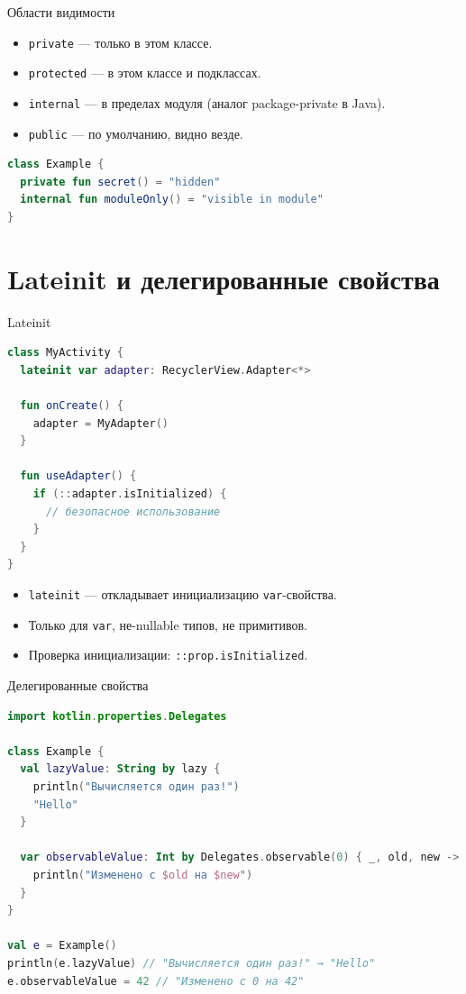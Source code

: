 \documentclass[aspectratio=169]{beamer}
\begin{document}
\begin{frame}[fragile]{Области видимости}
  \begin{itemize}
    \item \texttt{private} — только в этом классе.
    \item \texttt{protected} — в этом классе и подклассах.
    \item \texttt{internal} — в пределах модуля (аналог package-private в Java).
    \item \texttt{public} — по умолчанию, видно везде.
  \end{itemize}
  \begin{lstlisting}[language=Kotlin]
class Example {
  private fun secret() = "hidden"
  internal fun moduleOnly() = "visible in module"
}
  \end{lstlisting}
\end{frame}

\section{Lateinit и делегированные свойства}

\begin{frame}[fragile]{Lateinit}
  \begin{lstlisting}[language=Kotlin]
class MyActivity {
  lateinit var adapter: RecyclerView.Adapter<*>

  fun onCreate() {
    adapter = MyAdapter()
  }

  fun useAdapter() {
    if (::adapter.isInitialized) {
      // безопасное использование
    }
  }
}
  \end{lstlisting}
  \begin{itemize}
    \item \texttt{lateinit} — откладывает инициализацию \texttt{var}-свойства.
    \item Только для \texttt{var}, не-nullable типов, не примитивов.
    \item Проверка инициализации: \texttt{::prop.isInitialized}.
  \end{itemize}
\end{frame}

\begin{frame}[fragile]{Делегированные свойства}
  \begin{lstlisting}[language=Kotlin]
import kotlin.properties.Delegates

class Example {
  val lazyValue: String by lazy {
    println("Вычисляется один раз!")
    "Hello"
  }

  var observableValue: Int by Delegates.observable(0) { _, old, new ->
    println("Изменено с $old на $new")
  }
}

val e = Example()
println(e.lazyValue) // "Вычисляется один раз!" → "Hello"
e.observableValue = 42 // "Изменено с 0 на 42"
  \end{lstlisting}
\end{frame}
\end{document}
